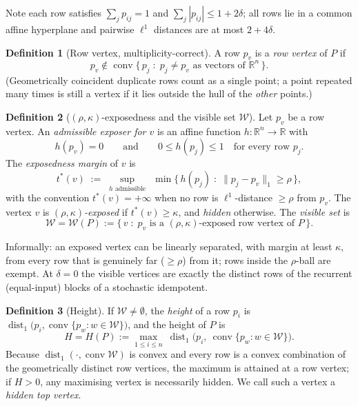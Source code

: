 \documentclass[11pt]{article}
\theoremstyle{plain}
\theoremstyle{definition}
\newtheorem{definition}{Definition}
\theoremstyle{remark}
\newcommand{\R}{\mathbb R}
\newcommand{\dist}{\operatorname{dist}_1}
\newcommand{\conv}{\operatorname{conv}}
\newcommand{\W}{\mathcal W}
\begin{document}
Note each row satisfies $\sum_j p_{ij}=1$ and $\sum_j |p_{ij}|\le 1+2\delta$; all rows lie
in a common affine hyperplane and pairwise $\ell^1$ distances are at most $2+4\delta$.

\begin{definition}[Row vertex, multiplicity-correct]\label{def:vertex}
A row $p_v$ is a \emph{row vertex} of $P$ if
\[
p_v\notin \conv\{\,p_j \;:\; p_j\neq p_v \text{ as vectors of } \R^n\,\}.
\]
(Geometrically coincident duplicate rows count as a single point; a point repeated many
times is still a vertex if it lies outside the hull of the \emph{other} points.)
\end{definition}

\begin{definition}[$(\rho,\kappa)$-exposedness and the visible set $\W$]\label{def:exposed}
Let $p_v$ be a row vertex. An \emph{admissible exposer for $v$} is an affine function
$h:\R^n\to\R$ with
\[
h(p_v)=0
\qquad\text{and}\qquad
0\le h(p_j)\le 1 \quad\text{for every row } p_j .
\]
The \emph{exposedness margin} of $v$ is
\[
t^*(v)\;:=\;\sup_{h \text{ admissible}}\ \ \min\{\,h(p_j)\;:\;\|p_j-p_v\|_1\ge\rho\,\},
\]
with the convention $t^*(v)=+\infty$ when no row is $\ell^1$-distance $\ge\rho$ from $p_v$.
The vertex $v$ is \emph{$(\rho,\kappa)$-exposed} if $t^*(v)\ge\kappa$, and
\emph{hidden} otherwise. The \emph{visible set} is
\[
\W=\W(P):=\{\, v \;:\; p_v \text{ is a } (\rho,\kappa)\text{-exposed row vertex of } P \,\}.
\]
\end{definition}

Informally: an exposed vertex can be linearly separated, with margin at least $\kappa$,
from every row that is genuinely far ($\ge\rho$) from it; rows inside the $\rho$-ball are
exempt. At $\delta=0$ the visible vertices are exactly the distinct rows of the recurrent
(equal-input) blocks of a stochastic idempotent.

\begin{definition}[Height]\label{def:height}
If $\W\neq\emptyset$, the \emph{height} of a row $p_i$ is
$\dist\!\big(p_i,\conv\{p_w:w\in\W\}\big)$, and the height of $P$ is
\[
H=H(P):=\max_{1\le i\le n}\ \dist\!\big(p_i,\ \conv\{p_w : w\in\W\}\big).
\]
Because $\dist(\cdot,\conv\W)$ is convex and every row is a convex combination of the
geometrically distinct row vertices, the maximum is attained at a row vertex; if $H>0$,
any maximising vertex is necessarily hidden. We call such a vertex a \emph{hidden top
vertex}.
\end{definition}
\end{document}
